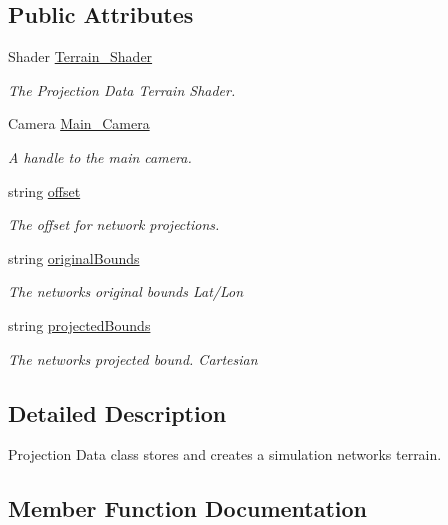 \subsection*{Public Attributes}
\begin{DoxyCompactItemize}
\item 
Shader \mbox{\hyperlink{class_projection_data_ab853560889dd0c25033de418ab53b478}{Terrain\+\_\+\+Shader}}
\begin{DoxyCompactList}\small\item\em The Projection Data Terrain Shader. \end{DoxyCompactList}\item 
Camera \mbox{\hyperlink{class_projection_data_adbd2a4f3f7ecfcc6bf1acf3e7c959ccb}{Main\+\_\+\+Camera}}
\begin{DoxyCompactList}\small\item\em A handle to the main camera. \end{DoxyCompactList}\item 
string \mbox{\hyperlink{class_projection_data_ace4939a5999be0db36408c5373d2b363}{offset}}
\begin{DoxyCompactList}\small\item\em The offset for network projections. \end{DoxyCompactList}\item 
string \mbox{\hyperlink{class_projection_data_ad006eaf3925882dc6039d65ae17de5c0}{original\+Bounds}}
\begin{DoxyCompactList}\small\item\em The networks original bounds Lat/\+Lon \end{DoxyCompactList}\item 
string \mbox{\hyperlink{class_projection_data_aa8e9a11cb798f79b76f73d508d5c4f99}{projected\+Bounds}}
\begin{DoxyCompactList}\small\item\em The networks projected bound. Cartesian \end{DoxyCompactList}\end{DoxyCompactItemize}


\subsection{Detailed Description}
Projection Data class stores and creates a simulation networks terrain. 



\subsection{Member Function Documentation}
\mbox{\label{class_projection_data_a7e00204c97b5c3c3e603e2ab55b4793a}} 
